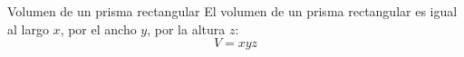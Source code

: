 
\begin{infocard}{Volumen de un prisma rectangular}
    El volumen de un prisma rectangular es igual al largo $x$, por el ancho $y$, por la altura $z$:
    \[ V = xyz \]
\end{infocard}
